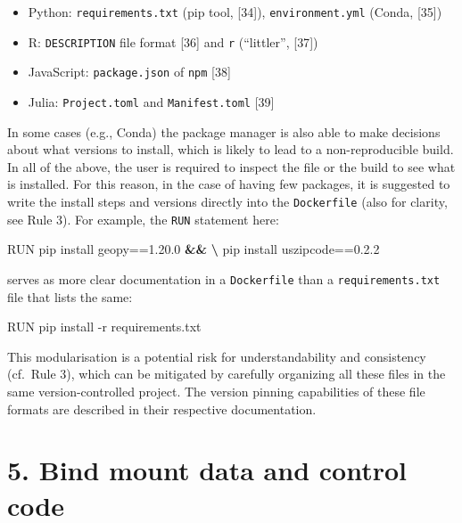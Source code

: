 \documentclass[10pt,letterpaper]{article}
\newenvironment{Shaded}{\begin{snugshade}}{\end{snugshade}}
\newcommand{\ExtensionTok}[1]{#1}
\newcommand{\KeywordTok}[1]{\textcolor[rgb]{0.13,0.29,0.53}{\textbf{#1}}}
\newcommand{\NormalTok}[1]{#1}
\providecommand{\tightlist}{%
  \setlength{\itemsep}{0pt}\setlength{\parskip}{0pt}}
\begin{document}
\begin{itemize}
\tightlist
\item
  Python: \texttt{requirements.txt} (pip tool, {[}34{]}),
  \texttt{environment.yml} (Conda, {[}35{]})
\item
  R: \texttt{DESCRIPTION} file format {[}36{]} and \texttt{r}
  (``littler'', {[}37{]})
\item
  JavaScript: \texttt{package.json} of \texttt{npm} {[}38{]}
\item
  Julia: \texttt{Project.toml} and \texttt{Manifest.toml} {[}39{]}
\end{itemize}

In some cases (e.g., Conda) the package manager is also able to make
decisions about what versions to install, which is likely to lead to a
non-reproducible build. In all of the above, the user is required to
inspect the file or the build to see what is installed. For this reason,
in the case of having few packages, it is suggested to write the install
steps and versions directly into the \texttt{Dockerfile} (also for
clarity, see Rule 3). For example, the \texttt{RUN} statement here:

\begin{Shaded}
\begin{Highlighting}[]
\ExtensionTok{RUN}\NormalTok{ pip install geopy==1.20.0 }\KeywordTok{&&} \KeywordTok{\textbackslash{}}
    \ExtensionTok{pip}\NormalTok{ install uszipcode==0.2.2}
\end{Highlighting}
\end{Shaded}

serves as more clear documentation in a \texttt{Dockerfile} than a
\texttt{requirements.txt} file that lists the same:

\begin{Shaded}
\begin{Highlighting}[]
\ExtensionTok{RUN}\NormalTok{ pip install -r requirements.txt}
\end{Highlighting}
\end{Shaded}

This modularisation is a potential risk for understandability and
consistency (cf.~Rule 3), which can be mitigated by carefully organizing
all these files in the same version-controlled project. The version
pinning capabilities of these file formats are described in their
respective documentation.

\hypertarget{bind-mount-data-and-control-code}{%
\section*{5. Bind mount data and control
code}\label{bind-mount-data-and-control-code}}
\end{document}
